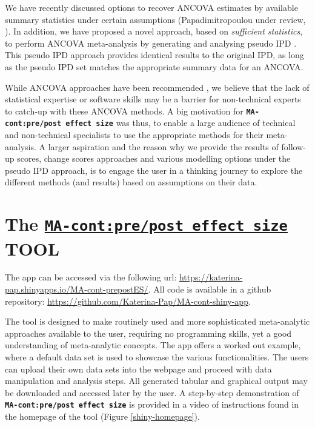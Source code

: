 \documentclass[AMA,STIX1COL]{WileyNJD-v2}
\begin{document}
We have recently discussed options to recover ANCOVA estimates by available summary statistics under certain assumptions (Papadimitropoulou under review, \cite{senn2006change, mckenzie2016impact}). In addition, we have proposed a novel approach, based on \textit{sufficient statistics}, to perform ANCOVA meta-analysis by generating and analysing pseudo IPD \citep{papadimitropoulou2020meta}. This pseudo IPD approach provides identical results to the original IPD, as long as the pseudo IPD set matches the appropriate summary data for an ANCOVA.

While ANCOVA approaches have been recommended \citep{fu2013handling, daly2021nice}, we believe that the lack of statistical expertise or software skills may be a barrier for non-technical experts to catch-up with these ANCOVA methods. A big motivation for \textbf{\texttt{MA-cont:pre/post effect size}} was thus, to enable a large audience of technical and non-technical specialists to use the appropriate methods for their meta-analysis. A larger aspiration and the reason why we provide the results of follow-up scores, change scores approaches and various modelling options under the pseudo IPD approach, is to engage the user in a thinking journey to explore the different methods (and results) based on assumptions on their data.

\section{The \href{https://katerina-pap.shinyapps.io/MA-cont-prepostES/}{\textbf{\texttt{MA-cont:pre/post effect size}}} TOOL}

The app can be accessed via the following url: \url{https://katerina-pap.shinyapps.io/MA-cont-prepostES/}. All code is available in a github repository: \url{https://github.com/Katerina-Pap/MA-cont-shiny-app}.

The tool is designed to make routinely used and more sophisticated meta-analytic approaches available to the user, requiring no programming skills, yet a good understanding of meta-analytic concepts. The app offers a worked out example, where a default data set is used to showcase the various functionalities. The users can upload their own data sets into the webpage and proceed with data manipulation and analysis steps. All generated tabular and graphical output may be downloaded and accessed later by the user.  A step-by-step demonstration of \textbf{\texttt{MA-cont:pre/post effect size}} is provided in a video of instructions found in the homepage of the tool (Figure \ref{shiny-homepage}).
\end{document}
